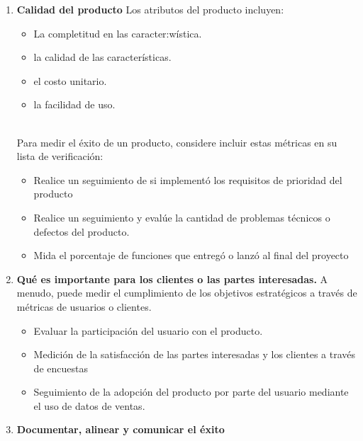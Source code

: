 \documentclass[10pt]{book}
\begin{document}
	\begin{enumerate}
	    \item \textbf{Calidad del producto} Los atributos del producto incluyen:
		\begin{itemize}
		    \item La completitud en las caracter:wística.
		    \item la calidad de las características.
		    \item el costo unitario.
		    \item la facilidad de uso.\\\\
		\end{itemize}
	    Para medir el éxito de un producto, considere incluir estas métricas en su lista de verificación: 
		\begin{itemize}
		    \item Realice un seguimiento de si implementó los requisitos de prioridad del producto
		    \item Realice un seguimiento y evalúe la cantidad de problemas técnicos o defectos del producto.
		    \item Mida el porcentaje de funciones que entregó o lanzó al final del proyecto
		\end{itemize}

	    \item \textbf{Qué es importante para los clientes o las partes interesadas.} A menudo, puede medir el cumplimiento de los objetivos estratégicos a través de métricas de usuarios o clientes.
		\begin{itemize}
		    \item Evaluar la participación del usuario con el producto.
		    \item Medición de la satisfacción de las partes interesadas y los clientes a través de encuestas
		    \item Seguimiento de la adopción del producto por parte del usuario mediante el uso de datos de ventas.
		\end{itemize}

	    \item \textbf{Documentar, alinear y comunicar el éxito}
	    
	\end{enumerate}
\end{document}
